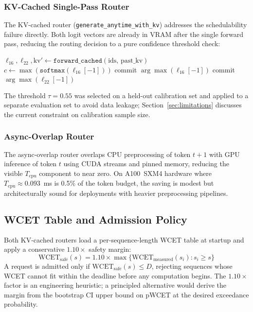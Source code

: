 \documentclass[conference]{IEEEtran}
\begin{document}
\subsubsection{KV-Cached Single-Pass Router}

The KV-cached router (\texttt{generate\_anytime\_with\_kv})
addresses the schedulability failure directly.
Both logit vectors are already in VRAM after the single forward
pass, reducing the routing decision to a pure confidence threshold check:
\begin{algorithmic}[1]
\STATE $\ell_{16}, \ell_{22}, \text{kv}' \leftarrow
       \texttt{forward\_cached}(\text{ids},\, \text{past\_kv})$
\STATE $c \leftarrow \max(\texttt{softmax}(\ell_{16}[-1]))$
    \STATE commit $\arg\max(\ell_{16}[-1])$ 
\ELSE
    \STATE commit $\arg\max(\ell_{22}[-1])$ 
\ENDIF
\end{algorithmic}

The threshold $\tau=0.55$ was selected on a held-out calibration
set and applied to a separate evaluation set to avoid data leakage;
Section~\ref{sec:limitations} discusses the current constraint on
calibration sample size.

\subsubsection{Async-Overlap Router}

The async-overlap router overlaps CPU preprocessing of token $t{+}1$
with GPU inference of token $t$ using CUDA streams and pinned memory,
reducing the visible $T_{\text{cpu}}$ component to near zero.
On A100~SXM4 hardware where $T_{\text{cpu}} \approx 0.093$~ms is
0.5\% of the token budget, the saving is modest but architecturally
sound for deployments with heavier preprocessing pipelines.

\subsection{WCET Table and Admission Policy}

Both KV-cached routers load a per-sequence-length WCET table at startup
and apply a conservative $1.10\times$ safety margin:
\begin{equation}
\text{WCET}_{\text{safe}}(s) = 1.10 \times
    \max\bigl\{\text{WCET}_{\text{measured}}(s_i) : s_i \geq s\bigr\}
\label{eq:wcet_safe}
\end{equation}
A request is admitted only if $\text{WCET}_{\text{safe}}(s) \leq D$,
rejecting sequences whose WCET cannot fit within the deadline before
any computation begins.
The $1.10\times$ factor is an engineering heuristic; a principled
alternative would derive the margin from the bootstrap CI upper bound
on pWCET at the desired exceedance probability.
\end{document}

